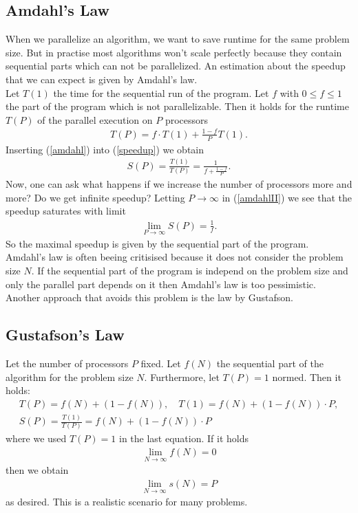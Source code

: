 \documentclass[a4paper, 11pt, twoside]{article}
\begin{document}
\subsection{Amdahl's Law}
When we parallelize an algorithm, we want to save runtime for the same problem size. But in practise most algorithms won't scale perfectly because they contain sequential parts which can not be parallelized. An estimation about the speedup that we can expect is given by Amdahl's law. \\
Let  $T(1)$ the time for the sequential run of the program. Let $f$ with $0 \leq f \leq 1$ the part of the program which is not parallelizable. Then it holds for the runtime $T(P)$ of the parallel execution on $P$ processors
\begin{align}
T(P) = f \cdot T(1) + \frac{1 - f}{P}T(1). \label{amdahl}
\end{align}
Inserting (\ref{amdahl}) into (\ref{speedup}) we obtain
\begin{align}
S(P) = \frac{T(1)}{T(P)} = \frac{1}{f + \frac{1-f}{P}}. \label{amdahlII}
\end{align}
Now, one can ask what happens if we increase the number of processors more and more? Do we get infinite speedup? Letting $P \to \infty$ in (\ref{amdahlII}) we see that the speedup saturates with limit
\begin{align*}
\lim_{P \to \infty} S(P) = \frac{1}{f}.
\end{align*}
So the maximal speedup is given by the sequential part of the program. \\
Amdahl's law is often beeing critisised because it does not consider the problem size $N$. If the sequential part of the program is independ on the problem size and only the parallel part depends on it then Amdahl's law is too pessimistic. Another approach that avoids this problem is the law by Gustafson.

\subsection{Gustafson's Law}
Let the number of processors $P$ fixed. Let $f(N)$ the sequential part of the algorithm for the problem size $N$. Furthermore, let $T(P) = 1$ normed. Then it holds:
\begin{align*}
T(P) = f(N) + (1 - f(N)), \quad T(1) = f(N) + (1 - f(N)) \cdot P, \\
S(P) = \frac{T(1)}{T(P)} = f(N) + (1 - f(N)) \cdot P
\end{align*}
where we used $T(P) = 1$ in the last equation. If it holds
\begin{align*}
\lim_{N \to \infty} f(N) = 0
\end{align*}
then we obtain
\begin{align*}
\lim_{N \to \infty} s(N) = P
\end{align*}
as desired. This is a realistic scenario for many problems.

\newpage
\appendix




\printindex
\end{document}
